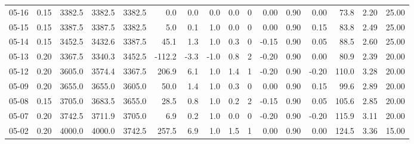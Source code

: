 \begin{threeparttable}
{\begin{tabular}{lrrrrrrrrrrrrrrr}
  05-16 &     0.15 & 3382.5 & 3382.5 & 3382.5 &        0.0 &            0.0 &                      0.0 &                 0.0 &              0 &       0.00 &      0.90 &           0.00 &             73.8 &            2.20 &                  25.00 \\
  05-15 &     0.15 & 3387.5 & 3387.5 & 3382.5 &        5.0 &            0.1 &                      1.0 &                 0.0 &              0 &       0.00 &      0.90 &           0.15 &             83.8 &            2.49 &                  25.00 \\
  05-14 &     0.15 & 3452.5 & 3432.6 & 3387.5 &       45.1 &            1.3 &                      1.0 &                 0.3 &              0 &      -0.15 &      0.90 &           0.05 &             88.5 &            2.60 &                  25.00 \\
  05-13 &     0.20 & 3367.5 & 3340.3 & 3452.5 &     -112.2 &           -3.3 &                     -1.0 &                 0.8 &              2 &      -0.20 &      0.90 &           0.00 &             80.9 &            2.39 &                  20.00 \\
  05-12 &     0.20 & 3605.0 & 3574.4 & 3367.5 &      206.9 &            6.1 &                      1.0 &                 1.4 &              1 &      -0.20 &      0.90 &          -0.20 &            110.0 &            3.28 &                  20.00 \\
  05-09 &     0.20 & 3655.0 & 3655.0 & 3605.0 &       50.0 &            1.4 &                      1.0 &                 0.3 &              0 &       0.00 &      0.90 &           0.15 &             99.6 &            2.89 &                  20.00 \\
  05-08 &     0.15 & 3705.0 & 3683.5 & 3655.0 &       28.5 &            0.8 &                      1.0 &                 0.2 &              2 &      -0.15 &      0.90 &           0.05 &            105.6 &            2.85 &                  20.00 \\
  05-07 &     0.20 & 3742.5 & 3711.9 & 3705.0 &        6.9 &            0.2 &                      1.0 &                 0.0 &              0 &      -0.20 &      0.90 &          -0.20 &            115.9 &            3.11 &                  20.00 \\
  05-02 &     0.20 & 4000.0 & 4000.0 & 3742.5 &      257.5 &            6.9 &                      1.0 &                 1.5 &              1 &       0.00 &      0.90 &           0.00 &            124.5 &            3.36 &                  15.00 \\

\end{tabular}}
\end{threeparttable}
